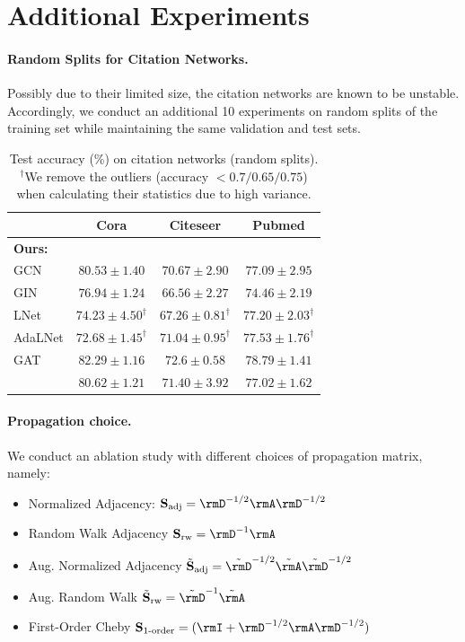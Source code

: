 \section{Additional Experiments}
%
%
\paragraph{Random Splits for Citation Networks.}
Possibly due to their limited size, the citation networks are known to be unstable. 
Accordingly, we conduct an additional 10 experiments on random splits of the training set while maintaining the same validation and test sets. 
%
\begin{table}[th!]
\small
\centering
\caption{Test accuracy (\%) on citation networks (random splits). $^\dagger$We remove the outliers (accuracy $< 0.7/0.65/0.75$) when calculating their statistics due to high variance.}
\label{table:citation-random}
\begin{tabular}{l|c|c|c}
\toprule
 & Cora & Citeseer & Pubmed \\ 
\midrule
\multicolumn{4}{l}{\textbf{Ours:}} \\
GCN &  $80.53 \pm{1.40}$ & $70.67\pm{2.90}$ & $77.09 \pm{2.95}$\\
GIN  & $76.94 \pm 1.24$ & $66.56 \pm 2.27$ & $74.46 \pm 2.19$ \\
LNet & $74.23 \pm 4.50^\dagger$ & $67.26 \pm 0.81^\dagger$ & $77.20 \pm 2.03^\dagger$ \\
AdaLNet & $72.68 \pm 1.45^\dagger$ & $71.04 \pm 0.95^\dagger$ & $77.53 \pm 1.76^\dagger$ \\
GAT  & $82.29 \pm{1.16}$ & $72.6 \pm{0.58}$  & $78.79 \pm{1.41}$ \\
{\color{modelblue} \method{}} & $80.62 \pm{1.21}$ & $71.40 \pm{3.92}$ & $77.02 \pm{1.62} $\\
 \bottomrule
\end{tabular}
\end{table}
%
\paragraph{Propagation choice.}
We conduct an ablation study with different choices of propagation matrix, namely:
\begin{itemize}
\item[] Normalized Adjacency: $\mathbf{S}_{\text{adj}} = \rmD^{-1/2}\rmA \rmD^{-1/2}$
\item[] Random Walk Adjacency $\mathbf{S}_{\text{rw}} = \rmD^{-1}\rmA$
\item[] Aug. Normalized Adjacency $\tilde{\mathbf{S}}_{\text{adj}} = \tilde{\rmD}^{-1/2}\tilde{\rmA} \tilde{\rmD}^{-1/2}$ \item[] Aug. Random Walk $\tilde{\mathbf{S}}_{\text{rw}} = \tilde{\rmD}^{-1} \tilde{\rmA}$ 
\item[] First-Order Cheby $\mathbf{S}_{\text{1-order}}=(\rmI + \rmD^{-1/2}\rmA \rmD^{-1/2} )$
\end{itemize}

